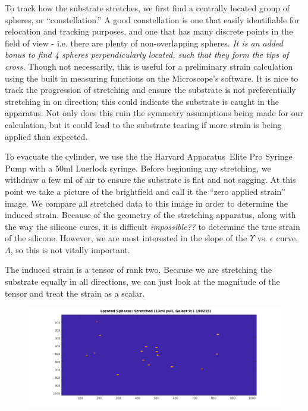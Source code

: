 To track how the substrate stretches, we first find a centrally located group of spheres, or ``constellation.'' A good constellation is one that easily identifiable for relocation and tracking purposes, and one that has many discrete points in the field of view - i.e. there are plenty of non-overlapping spheres. \emph{It is an added bonus to find 4 spheres perpendicularly located, such that they form the tips of cross.} Though not necessarily, this is useful for a preliminary strain calculation using the built in measuring functions on the Microscope's software. It is nice to track the progression of stretching and ensure the substrate is not preferentially stretching in on direction; this could indicate the substrate is caught in the apparatus. Not only does this ruin the symmetry assumptions being made for our calculation, but it could lead to the substrate tearing if more strain is being applied than expected.

To evacuate the cylinder, we use the the Harvard Apparatus\texttrademark \ Elite Pro Syringe Pump with a 50ml Luerlock syringe. Before beginning any stretching, we withdraw a few ml of air to ensure the substrate is flat and not sagging. At this point we take a picture of the brightfield and call it the ``zero applied strain'' image. We compare all stretched data to this image in order to determine the induced strain. Because of the geometry of the stretching apparatus, along with the way the silicone cures, it is difficult \emph{impossible??} to determine the true strain of the silicone. However, we are most interested in the slope of the $\Upsilon$ vs. $\epsilon$ curve, $\Lambda$, so this is not vitally important.

The induced strain is a tensor of rank two. Because we are stretching the substrate equally in all directions, we can just look at the magnitude of the tensor and treat the strain as a scalar.     


\begin{figure}[h!]
	\centering
	\includegraphics[width=\linewidth]{Chapters/Figures/13ml_stretched_2D_located}
	\caption[Unstretched]{}
	\label{fig:13mlstretched2dlocated}
\end{figure}

